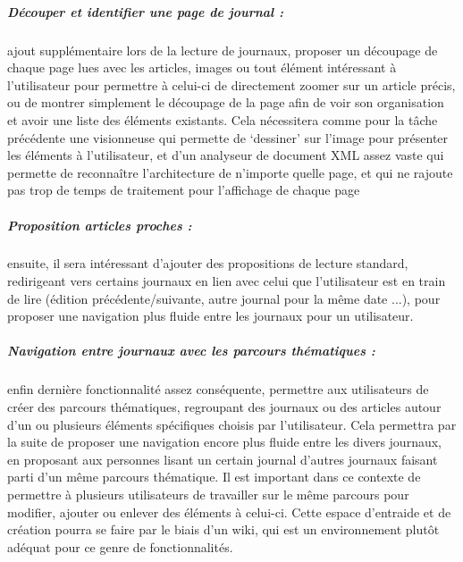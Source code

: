     \subparagraph{Découper et identifier une page de journal :}
    ajout supplémentaire lors de la lecture de journaux, proposer un découpage de chaque page lues avec les articles,
    images ou tout élément intéressant à l’utilisateur pour permettre à celui-ci de directement zoomer sur
    un article précis, ou de montrer simplement le découpage de la page afin de voir son organisation et avoir
    une liste des éléments existants. Cela nécessitera comme pour la tâche précédente une visionneuse
    qui permette de ‘dessiner’ sur l’image pour présenter les éléments à l’utilisateur, et d’un analyseur
    de document XML assez vaste qui permette de reconnaître l’architecture de n’importe quelle page,
    et qui ne rajoute pas trop de temps de traitement pour l’affichage de chaque page

    \subparagraph{Proposition articles proches :}
    ensuite, il sera intéressant d’ajouter des propositions de lecture standard, redirigeant vers certains
    journaux en lien avec celui que l’utilisateur est en train de lire (édition précédente/suivante,
    autre journal pour la même date ...), pour proposer une navigation plus fluide entre les journaux pour un utilisateur.

    \subparagraph{Navigation entre journaux avec les parcours thématiques :}
    enfin dernière fonctionnalité assez conséquente, permettre aux utilisateurs de créer des parcours thématiques,
    regroupant des journaux ou des articles autour d’un ou plusieurs éléments spécifiques choisis par l’utilisateur.
    Cela permettra par la suite de proposer une navigation encore plus fluide entre les divers journaux,
    en proposant aux personnes lisant un certain journal d’autres journaux faisant parti d’un même parcours thématique.
    Il est important dans ce contexte de permettre à plusieurs utilisateurs de travailler sur le même parcours
    pour modifier, ajouter ou enlever des éléments à celui-ci. Cette espace d’entraide et de création pourra
    se faire par le biais d’un wiki, qui est un environnement plutôt adéquat pour ce genre de fonctionnalités.
